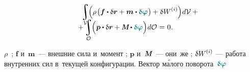 \begin{otherlanguage}{russian}
\nopagebreak\vspace{-0.3em}\begin{multline}
\hspace*{2em}
\integral\displaylimits_{\mathcal{V}} \hspace{-0.64ex} \left(^{\mathstrut} \hspace{-0.1ex} \rho \hspace{.2ex} \bigl( \bm{f} \dotp \variation{\currentvector} + \bm{m} \dotp \littlerotationvector \hspace{.1ex} \bigr) \hspace{-0.1ex} + \hspace{.1ex} \variation{\internalwork} \hspace{.1ex} \right) \hspace{-0.3ex} d\mathcal{V}
\hspace{.5ex} + \\[-1.2em]
%
+ \integral\displaylimits_{\mathcal{O}} \hspace{-0.64ex} \left(^{\mathstrut} \bm{p} \dotp \variation{\currentvector} + \mathboldM \hspace{-0.1ex} \dotp \littlerotationvector \right) \hspace{-0.3ex} d\mathcal{O} \hspace{.1ex}
= \hspace{.1ex} 0 \hspace{.1ex} .
\hspace*{2em}
\end{multline}

\vspace{-0.2em} \noindent {}
$\rho$~;
$\bm{f}$ и~$\bm{m}$~--- внешние сила и~момент ;
$\bm{p}$ и~$\mathboldM$~--- они~же ;
${\variation{\internalwork}\hspace{-0.2ex}}$~--- работа внутренних сил  в~текущей конфигурации.
Вектор м\'{а}лого поворота~$\littlerotationvector$


\end{otherlanguage}
